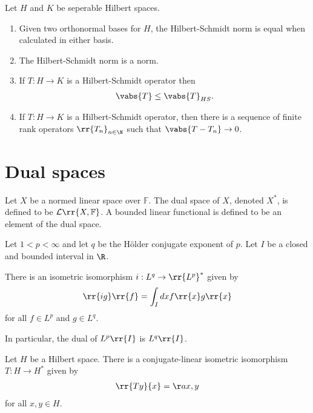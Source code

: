\documentclass{article}
\begin{document}
\begin{theorem}
  Let $H$ and $K$ be seperable Hilbert spaces.
  \begin{enumerate}
    \item Given two orthonormal bases for $H$, the Hilbert-Schmidt norm is equal when calculated in either basis.
    \item The Hilbert-Schmidt norm is a norm.
    \item If $T:H\to K$ is a Hilbert-Schmidt operator then
      \begin{align*}
        \vabs{T}\leq \vabs{T}_{HS}.
      \end{align*}
    \item If $T:H\to K$ is a Hilbert-Schmidt operator, then there is a sequence of finite rank
      operators $\rr{T_n}_{n\in\N}$ such that $\vabs{T-T_n}\to 0$.
  \end{enumerate}
\end{theorem}

\section{Dual spaces}

\begin{definition}
  Let $X$ be a normed linear space over $\mathbb F$. The dual space of $X$, denoted $X^*$, is defined
  to be $\mathcal L\rr{X,\mathbb F}$. A bounded linear functional is defined to be an element
  of the dual space.
\end{definition}

\begin{theorem}
  Let $1<p<\infty$ and let $q$ be the H\"older conjugate exponent of $p$. Let $I$ be a closed
  and bounded interval in $\R$.

  There is an isometric isomorphism $i:L^q\to \rr{L^p}^*$ given by
  \begin{align*}
    \rr{ig}\rr{f} = \int_I dx f\rr{x}g \rr{x}
  \end{align*}
  for all $f\in L^p$ and $g\in L^q$.

  In particular, the dual of $L^p\rr{I}$ is $L^q\rr{I}$.
\end{theorem}

\begin{theorem}
  Let $H$ be a Hilbert space. There is a conjugate-linear isometric isomorphism $T:H\to H^*$
  given by
  \begin{align*}
    \rr{Ty}{x}=\aa{x,y}
  \end{align*}
  for all $x,y\in H$.
\end{theorem}
\end{document}
